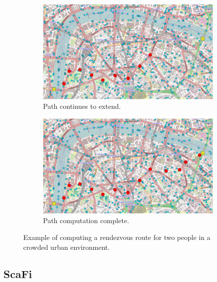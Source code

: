 \begin{figure}
\begin{subfigure}[b]{.49\textwidth}
        \label{fig:protelis-example-b}
    \end{subfigure}
    \hfill
    \begin{subfigure}[b]{.49\textwidth}
        \centering
        \includegraphics[width=\textwidth]{figures/protelis-example-c.png}
        \caption{Path continues to extend.}
        \label{fig:protelis-example-c}
    \end{subfigure}
    \hfill
    \begin{subfigure}[b]{.49\textwidth}
        \centering
        \includegraphics[width=\textwidth]{figures/protelis-example-d.png}
        \caption{Path computation complete.}
        \label{fig:protelis-example-d}
    \end{subfigure}
    \caption{Example of computing a rendezvous route for two people in a crowded urban environment.}
    \label{fig:protelis-example-map}
\end{figure}


\subsection{ScaFi}

